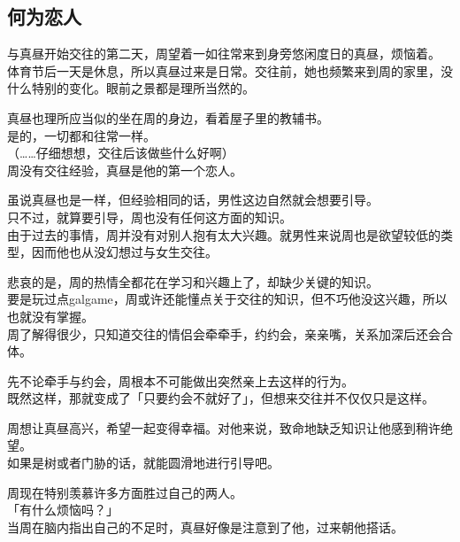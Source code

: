 \subsection{何为恋人}

与真昼开始交往的第二天，周望着一如往常来到身旁悠闲度日的真昼，烦恼着。\\

体育节后一天是休息，所以真昼过来是日常。交往前，她也频繁来到周的家里，没什么特别的变化。眼前之景都是理所当然的。

真昼也理所应当似的坐在周的身边，看着屋子里的教辅书。\\

是的，一切都和往常一样。\\

（……仔细想想，交往后该做些什么好啊）\\

周没有交往经验，真昼是他的第一个恋人。

虽说真昼也是一样，但经验相同的话，男性这边自然就会想要引导。\\

只不过，就算要引导，周也没有任何这方面的知识。\\

由于过去的事情，周并没有对别人抱有太大兴趣。就男性来说周也是欲望较低的类型，因而他也从没幻想过与女生交往。

悲哀的是，周的热情全都花在学习和兴趣上了，却缺少关键的知识。\\

要是玩过点galgame，周或许还能懂点关于交往的知识，但不巧他没这兴趣，所以也就没有掌握。\\

周了解得很少，只知道交往的情侣会牵牵手，约约会，亲亲嘴，关系加深后还会合体。

先不论牵手与约会，周根本不可能做出突然亲上去这样的行为。\\

既然这样，那就变成了「只要约会不就好了」，但想来交往并不仅仅只是这样。

周想让真昼高兴，希望一起变得幸福。对他来说，致命地缺乏知识让他感到稍许绝望。\\

如果是树或者门胁的话，就能圆滑地进行引导吧。

周现在特别羡慕许多方面胜过自己的两人。\\

「有什么烦恼吗？」\\

当周在脑内指出自己的不足时，真昼好像是注意到了他，过来朝他搭话。\\

